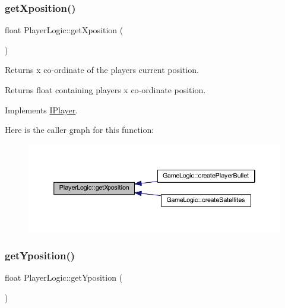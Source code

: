 \subsubsection{\texorpdfstring{get\+Xposition()}{getXposition()}}
{\footnotesize\ttfamily float Player\+Logic\+::get\+Xposition (\begin{DoxyParamCaption}{ }\end{DoxyParamCaption})\hspace{0.3cm}{\ttfamily [virtual]}}



Returns x co-\/ordinate of the player\textquotesingle{}s current position. 

\begin{DoxyReturn}{Returns}
float containing players x co-\/ordinate position. 
\end{DoxyReturn}


Implements \hyperlink{class_i_player_a9df96a1fd43f35f2579e2ec4a167acfe}{I\+Player}.

Here is the caller graph for this function\+:
\nopagebreak
\begin{figure}[H]
\begin{center}
\leavevmode
\includegraphics[width=350pt]{class_player_logic_a9f92defe2d43690329bd6e334fb61e01_icgraph}
\end{center}
\end{figure}
\mbox{\label{class_player_logic_a58d683bde5ee078f3b21897f2a5f4677}} 
\subsubsection{\texorpdfstring{get\+Yposition()}{getYposition()}}
{\footnotesize\ttfamily float Player\+Logic\+::get\+Yposition (\begin{DoxyParamCaption}{ }\end{DoxyParamCaption})\hspace{0.3cm}{\ttfamily [virtual]}}



